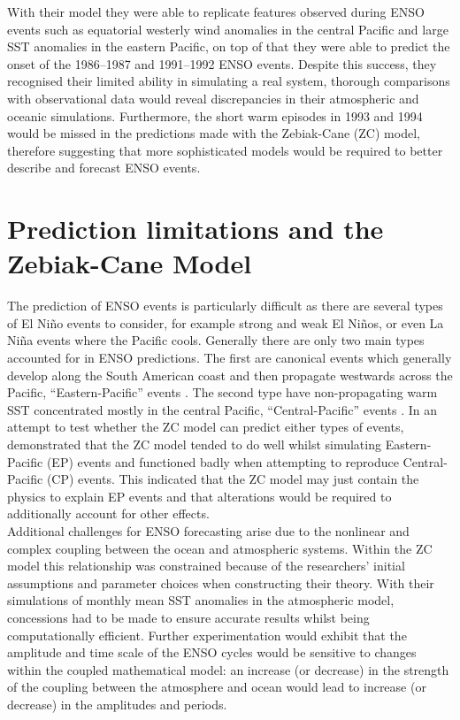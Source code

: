 \documentclass[12pt, onecolumn]{revtex4}    %
\begin{document}
With their model they were able to replicate features observed during ENSO events such as equatorial westerly wind anomalies in the central Pacific and large SST anomalies in the eastern Pacific, on top of that they were able to predict the onset of the 1986--1987 and 1991--1992 ENSO events. Despite this success, they recognised their limited ability in simulating a real system, thorough comparisons with observational data would reveal discrepancies in their atmospheric and oceanic simulations. Furthermore, the short warm episodes in 1993 and 1994 would be missed in the predictions made with the Zebiak-Cane (ZC) model, therefore suggesting that more sophisticated models would be required to better describe and forecast ENSO events.

\section{Prediction limitations and the Zebiak-Cane Model}

The prediction of ENSO events is particularly difficult as there are several types of El Ni\~{n}o events to consider, for example strong and weak El Ni\~{n}os, or even La Ni\~{n}a events where the Pacific cools. Generally there are only two main types accounted for in ENSO predictions. The first are canonical events which generally develop along the South American coast and then propagate westwards across the Pacific, ``Eastern-Pacific'' events \citep{rasmusson1982variations}. The second type have non-propagating warm SST concentrated mostly in the central Pacific, ``Central-Pacific'' events \citep{ashok2007nino}. In an attempt to test whether the ZC model can predict either types of events, \cite{duan2013behaviors} demonstrated that the ZC model tended to do well whilst simulating Eastern-Pacific (EP) events and functioned badly when attempting to reproduce Central-Pacific (CP) events. This indicated that the ZC model may just contain the physics to explain EP events and that alterations would be required to additionally account for other effects. \\

Additional challenges for ENSO forecasting arise due to the nonlinear and complex coupling between the ocean and atmospheric systems. Within the ZC model this relationship was constrained because of the researchers' initial assumptions and parameter choices when constructing their theory. With their simulations of monthly mean SST anomalies in the atmospheric model, concessions had to be made to ensure accurate results whilst being computationally efficient. Further experimentation would exhibit that the amplitude and time scale of the ENSO cycles would be sensitive to changes within the coupled mathematical model: an increase (or decrease) in the strength of the coupling between the atmosphere and ocean would lead to increase (or decrease) in the amplitudes and periods. \\
\end{document}
